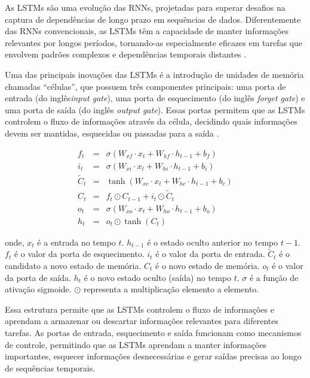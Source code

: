 As LSTMs são uma evolução das RNNs, projetadas para superar desafios na captura de dependências de longo prazo em sequências de dados. Diferentemente das RNNs convencionais, as LSTMs têm a capacidade de manter informações relevantes por longos períodos, tornando-as especialmente eficazes em tarefas que envolvem padrões complexos e dependências temporais distantes \cite{Zhang2021}.

Uma das principais inovações das LSTMs é a introdução de unidades de memória chamadas ``células'', que possuem três componentes principais: uma porta de entrada (do inglês\textit{input gate}), uma porta de esquecimento (do inglês \textit{forget gate}) e uma porta de saída (do inglês \textit{output gate}). Essas portas permitem que as LSTMs controlem o fluxo de informações através da célula, decidindo quais informações devem ser mantidas, esquecidas ou passadas para a saída \cite{Zhang2021}.



\begin{eqnarray}
	f_t &=& \sigma(W_{xf} \cdot x_t + W_{hf} \cdot h_{t-1} + b_f) \\
	i_t &=& \sigma(W_{xi} \cdot x_t + W_{hi} \cdot h_{t-1} + b_i) \\
	\tilde{C}_t &=& \tanh(W_{xc} \cdot x_t + W_{hc} \cdot h_{t-1} + b_c) \\
	C_t &=& f_t \odot C_{t-1} + i_t \odot \tilde{C}_t \\
	o_t &=& \sigma(W_{xo} \cdot x_t + W_{ho} \cdot h_{t-1} + b_o) \\
	h_t &=& o_t \odot \tanh(C_t)
\end{eqnarray}


\noindent onde, \(x_t\) é a entrada no tempo \(t\). \(h_{t-1}\) é o estado oculto anterior no tempo \(t-1\). \(f_t\) é o valor da porta de esquecimento. \(i_t\) é o valor da porta de entrada. \(\tilde{C}_t\) é o candidato a novo estado de memória. \(C_t\) é o novo estado de memória. \(o_t\) é o valor da porta de saída. \(h_t\) é o novo estado oculto (saída) no tempo \(t\). \(\sigma\) é a função de ativação sigmoide. \(\odot\) representa a multiplicação elemento a elemento.

Essa estrutura permite que as LSTMs controlem o fluxo de informações e aprendam a armazenar ou descartar informações relevantes para diferentes tarefas. As portas de entrada, esquecimento e saída funcionam como mecanismos de controle, permitindo que as LSTMs aprendam a manter informações importantes, esquecer informações desnecessárias e gerar saídas precisas ao longo de sequências temporais.


